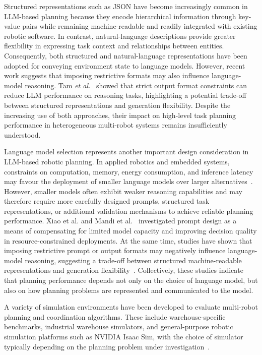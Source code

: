 Structured representations such as JSON have become increasingly common in LLM-based planning because they encode hierarchical information through key-value pairs while remaining machine-readable and readily integrated with existing robotic software. In contrast, natural-language descriptions provide greater flexibility in expressing task context and relationships between entities. Consequently, both structured and natural-language representations have been adopted for conveying environment state to language models. However, recent work suggests that imposing restrictive formats may also influence language-model reasoning. Tam \textit{et al.}~\cite{tam2024letmespeak} showed that strict output format constraints can reduce LLM performance on reasoning tasks, highlighting a potential trade-off between structured representations and generation flexibility. Despite the increasing use of both approaches, their impact on high-level task planning performance in heterogeneous multi-robot systems remains insufficiently understood.


Language model selection represents another important design consideration in LLM-based robotic planning. In applied robotics and embedded systems, constraints on computation, memory, energy consumption, and inference latency may favour the deployment of smaller language models over larger alternatives~\cite{dawane2026onddeviceslm}. However, smaller models often exhibit weaker reasoning capabilities and may therefore require more carefully designed prompts, structured task representations, or additional validation mechanisms to achieve reliable planning performance. Xiao et al. and Mandi et al.~\cite{xiao2026probingprompt,mandi2024roco} investigated prompt design as a means of compensating for limited model capacity and improving decision quality in resource-constrained deployments. At the same time, studies have shown that imposing restrictive prompt or output formats may negatively influence language-model reasoning, suggesting a trade-off between structured machine-readable representations and generation flexibility~\cite{sahoo2024promptsurvey,tam2024letmespeak}. Collectively, these studies indicate that planning performance depends not only on the choice of language model, but also on how planning problems are represented and communicated to the model.

A variety of simulation environments have been developed to evaluate multi-robot planning and coordination algorithms. These include warehouse-specific benchmarks, industrial warehouse simulators, and general-purpose robotic simulation platforms such as NVIDIA Isaac Sim, with the choice of simulator typically depending on the planning problem under investigation~\cite{krnjaic2024warehouse,niu2025symbiosis}.

